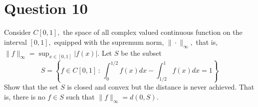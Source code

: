 \section{Question 10}

\horz
Consider $C[0,1],$ the space of all complex valued continuous function on the interval $[0,1],$ equipped with the supremum norm, $\|\cdot\|_{\infty},$ that is, $\|f\|_{\infty}=\sup_{x\in [0,1]} |f(x)|.$ Let $S$ be the subset
    \begin{equation*}
	S=\left\{ f \in C[0,1] \, : \, \int_{0}^{1/2} f\left( x \right) dx - \int_{1/2}^{1} f \left( x \right) dx =1 \right\}
    \end{equation*}
    Show that the set $S$ is closed and convex but the distance is never achieved. That is, there is no $f\in S$ such that $\|f\|_{\infty} = d(0,S)$.
    
\horz
